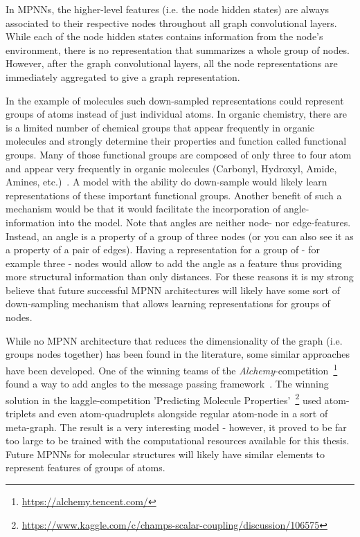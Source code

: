 In MPNNs, the higher-level features (i.e. the node hidden states) are always associated to their respective nodes throughout all graph convolutional layers. While each of the node hidden states contains information from the node's environment, there is no representation that summarizes a whole group of nodes. However, after the graph convolutional layers, all the node representations are immediately aggregated to give a graph representation.

In the example of molecules such down-sampled representations could represent groups of atoms instead of just individual atoms. In organic chemistry, there are is a limited number of chemical groups that appear frequently in organic molecules and strongly determine their properties and function called functional groups. Many of those functional groups are composed of only three to four atom and appear very frequently in organic molecules (Carbonyl, Hydroxyl, Amide, Amines, etc.)~\cite{Organic-chemistry}. A model with the ability do down-sample would likely learn representations of these important functional groups. Another benefit of such a mechanism would be that it would facilitate the incorporation of angle-information into the model. Note that angles are neither node- nor edge-features. Instead, an angle is a property of a group of three nodes (or you can also see it as a property of a pair of edges). Having a representation for a group of - for example three - nodes would allow to add the angle as a feature thus providing more structural information than only distances. For these reasons it is my strong believe that future successful MPNN architectures will likely have some sort of down-sampling mechanism that allows learning representations for groups of nodes.

While no MPNN architecture that reduces the dimensionality of the graph (i.e. groups nodes together) has been found in the literature, some similar approaches have been developed. One of the winning teams of the \textit{Alchemy}-competition~\footnote{\url{https://alchemy.tencent.com/}} found a way to add angles to the message passing framework~\cite{Klicpera2019}. The winning solution in the kaggle-competition 'Predicting Molecule Properties'~\footnote{\url{https://www.kaggle.com/c/champs-scalar-coupling/discussion/106575}} used atom-triplets and even atom-quadruplets alongside regular atom-node in a sort of meta-graph. The result is a very interesting model - however, it proved to be far too large to be trained with the computational resources available for this thesis. Future MPNNs for molecular structures will likely have similar elements to represent features of groups of atoms.




